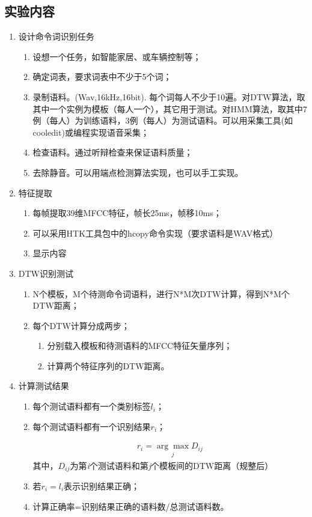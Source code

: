 \documentclass{hitreport}
\begin{document}
\subsection{实验内容}
\begin{enumerate}

\item 设计命令词识别任务 

\begin{enumerate}
\item 设想一个任务，如智能家居、或车辆控制等；
\item 确定词表，要求词表中不少于5个词；
\item 录制语料。(Wav,16kHz,16bit). 每个词每人不少于10遍。对DTW算法，取其中一个实例为模板（每人一个），其它用于测试。对HMM算法，取其中7例（每人）为训练语料，3例（每人）为测试语料。可以用采集工具(如cooledit)或编程实现语音采集；
\item 检查语料。通过听辩检查来保证语料质量；
\item 去除静音。可以用端点检测算法实现，也可以手工实现。
\end{enumerate}

\item 特征提取
\begin{enumerate}
\item 每帧提取39维MFCC特征，帧长25ms，帧移10ms；
\item 可以采用HTK工具包中的hcopy命令实现（要求语料是WAV格式）
\item 显示内容
\end{enumerate}

\item DTW识别测试 

\begin{enumerate}
\item N个模板，M个待测命令词语料，进行N*M次DTW计算，得到N*M个DTW距离；
\item 每个DTW计算分成两步；

\begin{enumerate}
\item 分别载入模板和待测语料的MFCC特征矢量序列；
\item 计算两个特征序列的DTW距离。
\end{enumerate}

\end{enumerate}

\item 计算测试结果 

\begin{enumerate}
\item 每个测试语料都有一个类别标签$l_i$；
\item 每个测试语料都有一个识别结果$r_i$；

\begin{align}
r_i = \underset{j}{\arg \max}D_{ij}
\end{align}
其中，$D_{ij}$为第\textit{i}个测试语料和第\textit{j}个模板间的DTW距离（规整后）
\item 若$r_i = l_i$表示识别结果正确；
\item 计算正确率=识别结果正确的语料数/总测试语料数。

\end{enumerate}

\end{enumerate}
\end{document}
